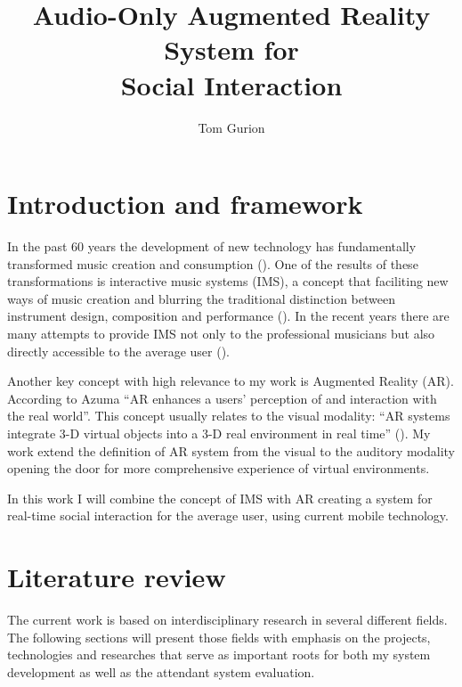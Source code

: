 \documentclass[a4paper,11pt]{article}
\title{Audio-Only Augmented Reality System for\\Social Interaction}
\author{Tom Gurion}
\begin{document}
\maketitle

\listoftodos


\section{Introduction and framework}

In the past 60 years the development of new technology has fundamentally transformed music creation and consumption (\cite{hargreaves99}).
One of the results of these transformations is interactive music systems (IMS), a concept that faciliting new ways of music creation and blurring the traditional distinction between instrument design, composition and performance (\cite{drummond09}).
In the recent years there are many attempts to provide IMS not only to the professional musicians but also directly accessible to the average user (\cite{stimulant13}).


Another key concept with high relevance to my work is Augmented Reality (AR).
According to Azuma ``AR enhances a users' perception of and interaction with the real world''.
This concept usually relates to the visual modality: ``AR systems integrate 3-D virtual objects into a 3-D real environment in real time'' (\cite{azuma97}).
My work extend the definition of AR system from the visual to the auditory modality opening the door for more comprehensive experience of virtual environments.

In this work I will combine the concept of IMS with AR creating a system for real-time social interaction for the average user, using current mobile technology.

\section{Literature review}

The current work is based on interdisciplinary research in several different fields.
The following sections will present those fields with emphasis on the projects, technologies and researches that serve as important roots for both my system development as well as the attendant system evaluation.
\end{document}
